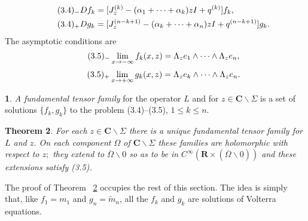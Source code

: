 \documentclass{surv-l}
\theoremstyle{plain}
\newtheorem{theorem}{Theorem}[section]
\theoremstyle{definition}
\newtheorem{definition}[theorem]{\sc{Definition}}
\numberwithin{equation}{chapter}
\begin{document}
\begin{align*}
&\tag*{$(3.4)_{-}$}  Df_{k}=[J_{z}^{(k)}-(\alpha_{1}+\cdots +\alpha_{k})zI+q^{(k)}]f_{k},\\ \notag
&\tag*{$(3.4)_{+}$}  Dg_{k}=[J_{z}^{(n-k+1)}-(\alpha_{k}+\cdots +\alpha_{n})zI+q^{(n-k+1)}]g_{k}.
\end{align*}
The asymptotic conditions are
\begin{equation*}
\tag*{$(3.5)_{-}$} \displaystyle \lim_{x\rightarrow-\infty} f_{k}(x, z)=\Lambda_{z}e_{1}\wedge\cdots\wedge\Lambda_{z}e_{n},
\end{equation*}
\begin{equation*}\label{eq3.35+}
\tag*{$(3.5)_{+}$}\displaystyle \lim_{x\rightarrow+\infty}  g_{k}(x,z)=\Lambda_{z}e_{k}\wedge \cdots\wedge\Lambda_{z}e_{n}.
\end{equation*}
\setcounter{theorem}{5}
\setcounter{equation}{7}
\begin{definition}\label{chap01:defi3.6}
\emph{A fundamental tensor family} for the operator $L$ and for $
z\in \mathbf{C}\backslash \Sigma$ is a set of solutions $\{f_{k},
g_{k}\}$ to the problem (3.4)--(3.5), $1\leq k\leq n$.
\end{definition}

\begin{theorem}\label{chap01:thm3.7}
For each $ z\in \mathbf{C}\backslash \Sigma$ there is a unique fundamental tensor family for $L$ and $z$. On each component $\Omega$ of $ \mathbf{C}\backslash \Sigma$ these families are holomorphic with respect to $z;$ they extend to $\overline{\Omega}\backslash 0$ so as to be in $C^{\infty}(\mathbf{R}\times(\overline{\Omega}\backslash 0))$ and these extensions satisfy \emph{(3.5)}.
\end{theorem}

The proof of Theorem ~\ref{chap01:thm3.7} occupies the rest of this section. The idea is simply that, like $f_{1}=m_{1}$ and $g_{n}=\tilde{m}_{n}$, all the $f_{k}$ and $g_{k}$ are solutions of Volterra equations.
\end{document}
